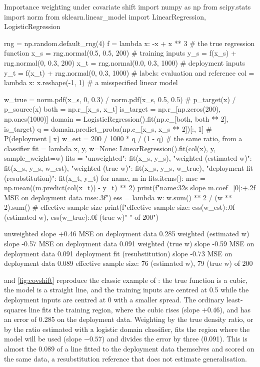 \begin{pylisting}[label={lst:covshift}]{Importance weighting under covariate shift}
import numpy as np
from scipy.stats import norm
from sklearn.linear_model import LinearRegression, LogisticRegression

rng = np.random.default_rng(4)
f = lambda x: -x + x ** 3                              # the true regression function
x_s = rng.normal(0.5, 0.5, 200)                        # training inputs
y_s = f(x_s) + rng.normal(0, 0.3, 200)
x_t = rng.normal(0.0, 0.3, 1000)                       # deployment inputs
y_t = f(x_t) + rng.normal(0, 0.3, 1000)                # labels: evaluation and reference
col = lambda x: x.reshape(-1, 1)                       # a misspecified linear model

w_true = norm.pdf(x_s, 0, 0.3) / norm.pdf(x_s, 0.5, 0.5)    # p_target(x) / p_source(x)
both = np.r_[x_s, x_t]
is_target = np.r_[np.zeros(200), np.ones(1000)]
domain = LogisticRegression().fit(np.c_[both, both ** 2], is_target)
q = domain.predict_proba(np.c_[x_s, x_s ** 2])[:, 1]   # P(deployment | x)
w_est = 200 / 1000 * q / (1 - q)                       # the same ratio, from a classifier
fit = lambda x, y, w=None: LinearRegression().fit(col(x), y, sample_weight=w)
fits = {"unweighted": fit(x_s, y_s), "weighted (estimated w)": fit(x_s, y_s, w_est),
        "weighted (true w)": fit(x_s, y_s, w_true),
        "deployment fit (resubstitution)": fit(x_t, y_t)}
for name, m in fits.items():
    mse = np.mean((m.predict(col(x_t)) - y_t) ** 2)
    print(f"{name:32s} slope {m.coef_[0]:+.2f}   MSE on deployment data {mse:.3f}")
ess = lambda w: w.sum() ** 2 / (w ** 2).sum()          # effective sample size
print(f"effective sample size: {ess(w_est):.0f} (estimated w), {ess(w_true):.0f} (true w)"
      " of 200")
\end{pylisting}
\begin{pyoutput}
unweighted                       slope +0.46   MSE on deployment data 0.285
weighted (estimated w)           slope -0.57   MSE on deployment data 0.091
weighted (true w)                slope -0.59   MSE on deployment data 0.091
deployment fit (resubstitution)  slope -0.73   MSE on deployment data 0.089
effective sample size: 76 (estimated w), 79 (true w) of 200
\end{pyoutput}

 and \cref{fig:covshift} reproduce the classic example of \citet{shimodaira2000improving}: the true
function is a cubic, the model is a straight line, and the training inputs are centred at 0.5 while the deployment inputs
are centred at 0 with a smaller spread. The ordinary least-squares line fits the training region, where the cubic rises
(slope $+0.46$), and has an error of 0.285 on the deployment data. Weighting by the true density ratio, or by the ratio
estimated with a logistic domain classifier, fits the region where the model will be used (slope $-0.57$) and divides the
error by three (0.091). This is almost the 0.089 of a line fitted to the deployment data themselves and scored on the same data, a
resubstitution reference that does not estimate generalisation.


